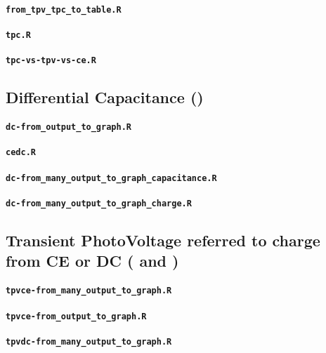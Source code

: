 \paragraph{\texttt{from_tpv_tpc_to_table.R}}
\paragraph{\texttt{tpc.R}}
\paragraph{\texttt{tpc-vs-tpv-vs-ce.R}}


\subsection{Differential Capacitance ()}\label{r_dc}

\paragraph{\texttt{dc-from_output_to_graph.R}}
\paragraph{\texttt{cedc.R}}
\paragraph{\texttt{dc-from_many_output_to_graph_capacitance.R}}
\paragraph{\texttt{dc-from_many_output_to_graph_charge.R}}

\subsection{Transient PhotoVoltage referred to charge from CE or DC ( and )}\label{r_tpvcedc}


\paragraph{\texttt{tpvce-from_many_output_to_graph.R}}
\paragraph{\texttt{tpvce-from_output_to_graph.R}}
\paragraph{\texttt{tpvdc-from_many_output_to_graph.R}}


